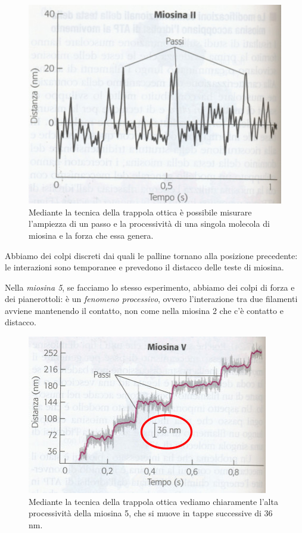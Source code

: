 \documentclass[a4paper,12pt]{article}
\begin{document}
\begin{figure}[H]
\centering
\includegraphics[scale=0.4]{immagine/miosina2.jpg}
\caption{Mediante la tecnica della trappola ottica è possibile misurare l'ampiezza di un passo e la processività di una singola molecola di miosina e la forza che essa genera.}
\end{figure}

Abbiamo dei colpi discreti dai quali le palline tornano alla posizione precedente: le interazioni sono temporanee e prevedono il distacco delle teste di miosina.

Nella \emph{miosina 5}, se facciamo lo stesso esperimento, abbiamo dei colpi di forza e dei pianerottoli: è un \emph{fenomeno processivo}, ovvero l'interazione tra due filamenti avviene mantenendo il contatto, non come nella miosina 2 che c'è contatto e distacco.
\begin{figure}[H]
\centering
\includegraphics[scale=0.5]{immagine/miosina5.jpg}
\caption{Mediante la tecnica della trappola ottica vediamo chiaramente l'alta processività della miosina 5, che si muove in tappe successive di 36 nm.}
\end{figure}
\end{document}
